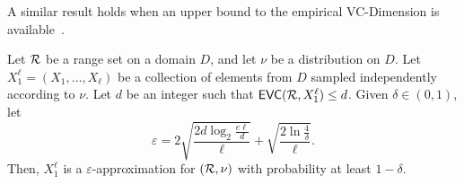 A similar result holds when an upper bound to the empirical VC-Dimension is
available~\citep{BoucheronBL05}.
\begin{theorem}\label{thm:eapproxempir}
  Let $\mathcal{R}$ be a range set on a domain
  $D$, and let $\nu$ be a distribution on $D$. Let
  $X_1^\ell=(X_1,\dotsc,X_\ell)$ be a collection of elements from $D$ sampled
  independently according to $\nu$. Let $d$ be an integer such that
  $\mathsf{EVC}(\mathcal{R},X_1^\ell)\le d$.
  Given $\delta\in(0,1)$, let
  \begin{equation}\label{eq:evceapprox}
    \varepsilon =
	2\sqrt{\frac{2d\log_2\frac{e\ell}{d}}{\ell}}+\sqrt{\frac{2\ln\frac{4}{\delta}}{\ell}}.
  \end{equation}
   Then, $X_1^\ell$ is a $\varepsilon$-approximation for $(\mathcal{R},\nu)$
   with probability at least $1-\delta$.
\end{theorem}

